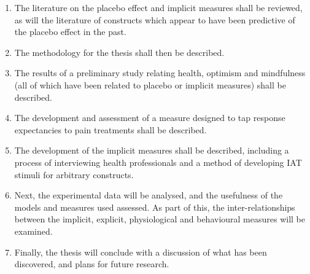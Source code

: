 \begin{enumerate}
\item The literature on the placebo effect and implicit measures shall be reviewed, as will the literature of constructs which appear to have been predictive of the placebo effect in the past. 

\item The methodology for the thesis shall then be described.

\item The results of a preliminary study relating health, optimism and mindfulness (all of which have been related to placebo or implicit measures) shall be described. 

\item The development and assessment of a measure designed to tap response expectancies to pain treatments shall be described. 


\item The development of the implicit measures shall be described, including a process of interviewing health professionals and a method of developing IAT stimuli for arbitrary constructs. 


\item Next, the experimental data will be analysed, and the usefulness of the models and measures used assessed. As part of this, the inter-relationships between the implicit, explicit, physiological and behavioural measures will be examined.


\item Finally, the thesis will conclude with a discussion of what has been discovered, and plans for future research. 
\end{enumerate}



